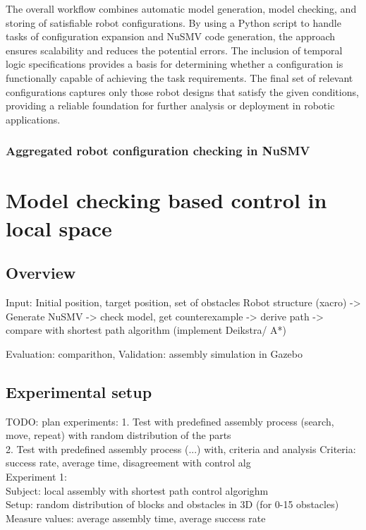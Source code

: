 The overall workflow combines automatic model generation, model checking,
and storing of satisfiable robot configurations. 
By using a Python script to handle tasks 
of configuration expansion and NuSMV code generation, the approach ensures 
scalability and reduces the potential errors. The inclusion of 
temporal logic specifications provides a basis for determining whether 
a configuration is functionally capable of achieving the task requirements. 
The final set of relevant configurations captures only those robot 
designs that satisfy the given conditions, providing a reliable foundation 
for further analysis or deployment in robotic applications.



\subsubsection{Aggregated robot configuration checking in NuSMV}

\newpage
\section{Model checking based control in local space}

\subsection{Overview}
Input: Initial position, target position, set of obstacles
Robot structure (xacro) -> Generate NuSMV -> check model, get counterexample -> 
derive path -> compare with shortest path algorithm (implement Deikstra/ A*)

Evaluation: comparithon, 
Validation: assembly simulation in Gazebo

\subsection{Experimental setup}
TODO: plan experiments: 
1. Test with predefined assembly process (search, move, repeat) 
with random distribution of the parts\\
2. Test with predefined assembly process (...) with, criteria and analysis 
Criteria: success rate, average time, disagreement with control alg\\

Experiment 1:\\ 
Subject: local assembly with shortest path control algorighm\\
Setup: random distribution of blocks and obstacles in 3D (for 0-15 obstacles) 
Measure values: average assembly time, average success rate

